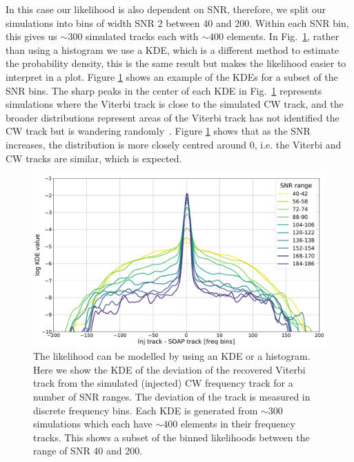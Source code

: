 In this case our likelihood is also dependent on \gls{SNR}, therefore, we split
our simulations into bins of width \gls{SNR} 2 between 40 and 200. Within each
\gls{SNR} bin, this gives us $\sim 300$ simulated tracks each with $\sim 400$
elements.  In Fig.~\ref{par_est:bayes:likelihood:kde142}, rather than using a histogram we use a \gls{KDE}, which is a different method to estimate the probability density, this is the same result but makes the likelihood easier to interpret in a plot. Figure \ref{par_est:bayes:likelihood:kde142} shows an example of the \glspl{KDE} for a subset of the \gls{SNR} bins. The sharp peaks in the center of
each \gls{KDE} in Fig.~\ref{par_est:bayes:likelihood:kde142} represents
simulations where the Viterbi track is close to the simulated \gls{CW} track,
and the broader distributions represent areas of the Viterbi track has not
identified the \gls{CW} track but is wandering randomly~.
Figure \ref{par_est:bayes:likelihood:kde142} shows that as the \gls{SNR}
increases, the distribution is more closely centred around 0, i.e. the Viterbi
and \gls{CW} tracks are similar, which is expected.

%
\begin{figure}[ht]
    \centering
    \includegraphics[width=\linewidth]{C5_parameter/KDE_range_40_200.pdf}
    \caption[KDE of likelihood in different \gls{SNR} ranges]{The likelihood can be modelled by using an \gls{KDE} or a histogram. Here we show the \gls{KDE} of the deviation of the recovered Viterbi track from
the simulated (injected) \gls{CW} frequency track for a number of \gls{SNR} ranges. The deviation of the track is
measured in discrete frequency bins. Each \gls{KDE} is generated from $\sim
300$ simulations which each have $\sim 400$ elements in their frequency tracks.
This shows a subset of the binned likelihoods between the range of \gls{SNR} 40
and 200.} \label{par_est:bayes:likelihood:kde142}
    \end{figure}
%


